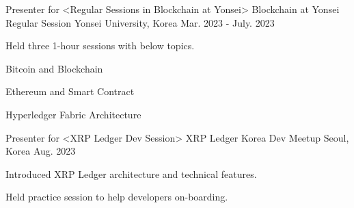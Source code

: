 


\begin{cventries}


\cventry
{Presenter for <Regular Sessions in Blockchain at Yonsei>} %
{Blockchain at Yonsei Regular Session} %
{Yonsei University, Korea} %
{Mar. 2023 - July. 2023} %
{ %
\begin{cvitems}
\item {Held three 1-hour sessions with below topics.}
\item {Bitcoin and Blockchain}
\item {Ethereum and Smart Contract}
\item {Hyperledger Fabric Architecture}
\end{cvitems}
}


\cventry
{Presenter for <XRP Ledger Dev Session>} %
{XRP Ledger Korea Dev Meetup} %
{Seoul, Korea} %
{Aug. 2023} %
{ %
\begin{cvitems}
\item {Introduced XRP Ledger architecture and technical features.}
\item {Held practice session to help developers on-boarding.}
\end{cvitems}
}


\end{cventries}